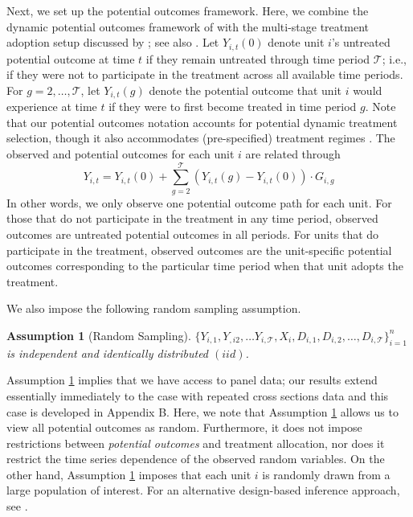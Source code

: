 \documentclass[11pt]{article}%
\theoremstyle{plain}
\newtheorem{assumption}{Assumption}
\numberwithin{sassumption}{section}
\numberwithin{equation}{section}
\begin{document}
Next, we set up the potential outcomes framework. Here, we combine the dynamic
potential outcomes framework of \cite{Robins1986, Robins1987} with the
multi-stage treatment adoption setup discussed by \cite{Heckman2016}; see also
\cite{Sianesi2004}. Let $Y_{i,t}(0)$ denote unit $i$'s untreated potential
outcome at time $t$ if they {remain untreated through time period}
$\mathcal{T}${; i.e., if they were not to participate in the treatment across all
available time periods}. For $g=2,\dots,\mathcal{T}$, let $Y_{i,t}(g)$ denote
the potential outcome that unit $i$ would experience at time $t$ if they were
to first become treated in time period $g$. Note that our potential outcomes
notation accounts for potential dynamic treatment selection, though it also
accommodates (pre-specified) treatment regimes \citep{Murphy2001, Murphy2003}.
The observed and potential outcomes for each unit $i$ are related through%
\begin{equation}
Y_{i,t}=Y_{i,t}\left(  0\right)  +\sum_{g=2}^{\mathcal{T}}\left(
Y_{i,t}\left(  g\right)  -Y_{i,t}\left(  0\right)  \right)  \cdot G_{i,g}
\label{eq:observational}%
\end{equation}
In other words, we only observe one potential outcome path for each unit. For
those that do not participate in the treatment in any time period, observed
outcomes are untreated potential outcomes in all periods. For units that do
participate in the treatment, observed outcomes are the unit-specific
potential outcomes corresponding to the particular time period when that unit
adopts the treatment.

We also impose the following random sampling assumption.

\begin{assumption}
[Random Sampling]\label{ass:iid} $\{Y_{i,1},Y_{,i2},\ldots Y_{i,\mathcal{T}%
},X_{i},D_{i,1},D_{i,2},\ldots,D_{i,\mathcal{T}}\}_{i=1}^{n}$ is independent
and identically distributed $(iid)$.
\end{assumption}

Assumption \ref{ass:iid} implies that we have access to panel data; {our
results extend essentially immediately to the case with repeated cross
sections data and this case is developed in Appendix B.} Here, we note that
Assumption \ref{ass:iid} allows us to view all potential outcomes as random.
Furthermore, it does not impose restrictions between
\emph{potential outcomes} and treatment allocation, nor does it restrict the time series dependence of
the observed random variables. On the other hand, Assumption \ref{ass:iid}
imposes that each unit $i$ is randomly drawn from a large population of
interest. For an alternative design-based inference approach, see
\cite{Athey2018}.
\end{document}
